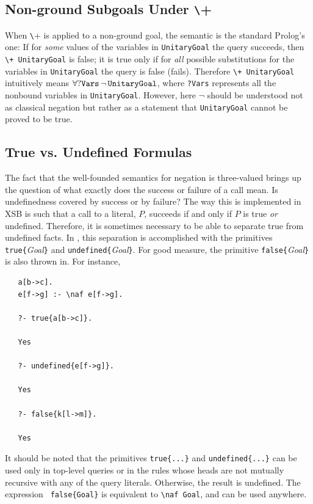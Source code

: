\documentclass[11pt]{article}
\newcommand{\ERGO}{\mbox{\smaller{\ensuremath{\cal{E}}\smaller{{\sc{RGO}}}}}\xspace}
\newcommand{\FLSYSTEM}{\ERGO}
\newcommand{\bs}{\textbackslash}
\newcommand{\PLGNAF}{\mbox{\texttt{\bs}+}\xspace}
\newcommand{\RULELOGNAF}{{\texttt{{\bs}naf}}\xspace}
\begin{document}
\subsection{Non-ground Subgoals Under \PLGNAF}

When \PLGNAF is applied to a non-ground goal, the semantic is the standard
Prolog's one: If for
\emph{some} values of the variables in {\tt UnitaryGoal} the query succeeds,
then {\tt \PLGNAF\ UnitaryGoal} is false; it is true only if for \emph{all} possible
substitutions for the variables in {\tt UnitaryGoal} the query is false
(fails). Therefore {\tt \PLGNAF\ UnitaryGoal} intuitively means $\tt\forall?Vars\,\neg\,UnitaryGoal$, where {\tt ?Vars} represents all the nonbound variables
in {\tt UnitaryGoal}. However, here $\neg$ should be understood not as classical
negation but rather as a statement that \texttt{UnitaryGoal}  cannot be proved to be true.


\subsection{True vs. Undefined Formulas}

The fact that the well-founded semantics for negation is three-valued
brings up the question of what exactly does the success or failure of a
call mean. Is undefinedness covered by success or by failure?  The way
this is implemented in XSB is such that a call to a literal, $P$, succeeds
if and only if $P$ is true \emph{or} undefined.  Therefore, it is sometimes
necessary to be able to separate true from undefined facts. In \FLSYSTEM, this
separation is accomplished with the \FLSYSTEM primitives
{\tt true\{}\emph{Goal}{\tt \}} and {\tt undefined\{}\emph{Goal}{\tt \}}.
For good measure, the primitive {\tt false\{}\emph{Goal}{\tt \}} is also
thrown in. For instance,
\begin{verbatim}
   a[b->c].
   e[f->g] :- \naf e[f->g].

   ?- true{a[b->c]}.

   Yes

   ?- undefined{e[f->g]}.

   Yes

   ?- false{k[l->m]}.

   Yes
\end{verbatim}
It should be noted that the primitives {\tt true\{...\}}  and
{\tt undefined\{...\}} can be used only in top-level queries or in the
rules whose heads are not mutually recursive with any of the
query literals. Otherwise, the result is undefined. The expression {\tt
  false\{Goal\}} is equivalent to {\tt \RULELOGNAF Goal},  and can be used
anywhere.
\end{document}
